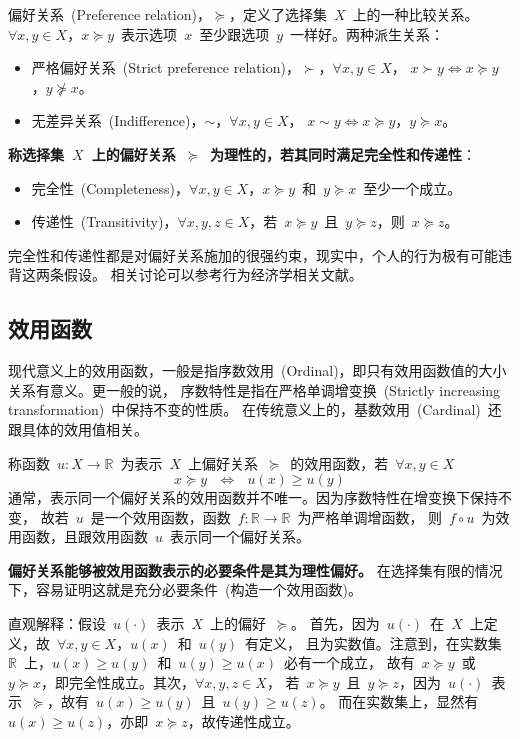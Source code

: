 \documentclass[a4paper,12pt]{article}
\begin{document}
偏好关系~(Preference relation)，$\succeq$，定义了选择集~$X$~上的一种比较关系。
$\forall x,y\in X$，$x\succeq y$~表示选项~$x$~至少跟选项~$y$~一样好。两种派生关系：
\begin{itemize}
  \item 严格偏好关系~(Strict preference relation)，$\succ$，$\forall x,y\in X$，
        $x\succ y \Leftrightarrow x\succeq y$，$y\nsucceq x$。
  \item 无差异关系~(Indifference)，$\sim$，$\forall x,y\in X$，
        $x\sim y \Leftrightarrow x\succeq y$，$y\succeq x$。
\end{itemize}
\textbf{称选择集~$X$~上的偏好关系~$\succeq$~为理性的，若其同时满足完全性和传递性}：
\begin{itemize}
  \item 完全性~(Completeness)，$\forall x,y\in X$，$x\succeq y$~和~$y\succeq x$~至少一个成立。
  \item 传递性~(Transitivity)，$\forall x,y,z\in X$，若~$x\succeq y$~且~$y\succeq z$，则~$x\succeq z$。
\end{itemize}
完全性和传递性都是对偏好关系施加的很强约束，现实中，个人的行为极有可能违背这两条假设。
相关讨论可以参考行为经济学相关文献。

\subsection{效用函数}

现代意义上的效用函数，一般是指序数效用~(Ordinal)，即只有效用函数值的大小关系有意义。更一般的说，
序数特性是指在严格单调增变换~(Strictly increasing transformation)~中保持不变的性质。
在传统意义上的，基数效用~(Cardinal)~还跟具体的效用值相关。

称函数~$u: X\rightarrow\mathbb{R}$~为表示~$X$~上偏好关系~$\succeq$~的效用函数，若~$\forall x,y\in X$
\begin{equation*}
    x\succeq y~~~\Leftrightarrow~~~u(x)\geq u(y)
\end{equation*}
通常，表示同一个偏好关系的效用函数并不唯一。因为序数特性在增变换下保持不变，
故若~$u$~是一个效用函数，函数~$f: \mathbb{R}\rightarrow \mathbb{R}$~为严格单调增函数，
则~$f\circ u$~为效用函数，且跟效用函数~$u$~表示同一个偏好关系。

\textbf{偏好关系能够被效用函数表示的必要条件是其为理性偏好。}
在选择集有限的情况下，容易证明这就是充分必要条件~(构造一个效用函数)。

直观解释：假设~$u(\cdot)$~表示~$X$~上的偏好~$\succeq$。
首先，因为~$u(\cdot)$~在~$X$~上定义，故~$\forall x,y\in X$，$u(x)$~和~$u(y)$~有定义，
且为实数值。注意到，在实数集~$\mathbb{R}$~上，$u(x)\geq u(y)$~和~$u(y)\geq u(x)$~必有一个成立，
故有~$x\succeq y$~或~$y\succeq x$，即完全性成立。其次，$\forall x,y,z\in X$，
若~$x\succeq y$~且~$y\succeq z$，因为~$u(\cdot)$~表示~$\succeq$，故有~$u(x)\geq u(y)$~且~$u(y)\geq u(z)$。
而在实数集上，显然有~$u(x)\geq u(z)$，亦即~$x\succeq z$，故传递性成立。
\end{document}

